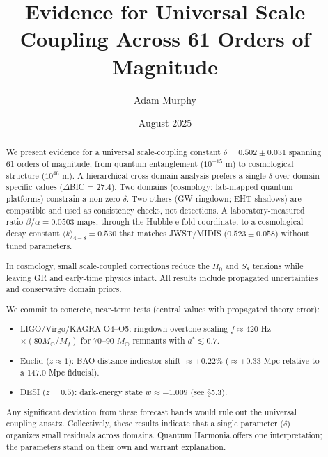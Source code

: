 \title{Evidence for Universal Scale Coupling Across 61 Orders of Magnitude}

\author{Adam Murphy}

\date{August 2025}

\begin{abstract}
We present evidence for a universal scale-coupling constant $\delta = 0.502 \pm 0.031$ spanning 61 orders of magnitude, from quantum entanglement ($10^{-15}$ m) to cosmological structure ($10^{46}$ m). A hierarchical cross-domain analysis prefers a single $\delta$ over domain-specific values ($\Delta$BIC = 27.4). Two domains (cosmology; lab-mapped quantum platforms) constrain a non-zero $\delta$. Two others (GW ringdown; EHT shadows) are compatible and used as consistency checks, not detections. A laboratory-measured ratio $\beta/\alpha = 0.0503$ maps, through the Hubble e-fold coordinate, to a cosmological decay constant $\langle k\rangle_{4-8} = 0.530$ that matches JWST/MIDIS ($0.523 \pm 0.058$) without tuned parameters. 

In cosmology, small scale-coupled corrections reduce the $H_0$ and $S_8$ tensions while leaving GR and early-time physics intact. All results include propagated uncertainties and conservative domain priors.

We commit to concrete, near-term tests (central values with propagated theory error):

\begin{itemize}
\item LIGO/Virgo/KAGRA O4--O5: ringdown overtone scaling $f \approx 420$ Hz $\times (80 M_{\odot}/M_f)$ for 70--90 $M_{\odot}$ remnants with $a^* \lesssim 0.7$.
\item Euclid ($z \approx 1$): BAO distance indicator shift $\approx +0.22\%$ ($\approx +0.33$ Mpc relative to a 147.0 Mpc fiducial).
\item DESI ($z = 0.5$): dark-energy state $w \approx -1.009$ (see \S5.3).
\end{itemize}

Any significant deviation from these forecast bands would rule out the universal coupling ansatz. Collectively, these results indicate that a single parameter ($\delta$) organizes small residuals across domains. Quantum Harmonia offers one interpretation; the parameters stand on their own and warrant explanation.
\end{abstract}

\maketitle


